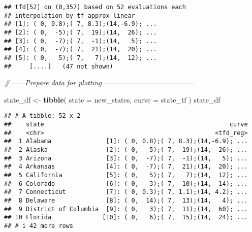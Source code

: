 \documentclass[
]{article}
\newenvironment{Shaded}{\begin{snugshade}}{\end{snugshade}}
\newcommand{\AttributeTok}[1]{\textcolor[rgb]{0.13,0.29,0.53}{#1}}
\newcommand{\CommentTok}[1]{\textcolor[rgb]{0.56,0.35,0.01}{\textit{#1}}}
\newcommand{\FunctionTok}[1]{\textcolor[rgb]{0.13,0.29,0.53}{\textbf{#1}}}
\newcommand{\NormalTok}[1]{#1}
\newcommand{\OtherTok}[1]{\textcolor[rgb]{0.56,0.35,0.01}{#1}}
\begin{document}
\begin{verbatim}
## tfd[52] on (0,357) based on 52 evaluations each
## interpolation by tf_approx_linear 
## [1]: ( 0, 0.8);( 7, 8.3);(14,-6.9); ...
## [2]: ( 0,  -5);( 7,  19);(14,  26); ...
## [3]: ( 0,  -7);( 7,  -1);(14,   5); ...
## [4]: ( 0,  -7);( 7,  21);(14,  20); ...
## [5]: ( 0,   5);( 7,   7);(14,  12); ...
##     [....]   (47 not shown)
\end{verbatim}

\begin{Shaded}
\begin{Highlighting}[]
\CommentTok{\# ── Prepare data for plotting ──────────────────}

\NormalTok{state\_df }\OtherTok{\textless{}{-}} \FunctionTok{tibble}\NormalTok{(}
  \AttributeTok{state =}\NormalTok{ new\_states,}
  \AttributeTok{curve =}\NormalTok{ state\_tf}
\NormalTok{)}
\NormalTok{state\_df}
\end{Highlighting}
\end{Shaded}

\begin{verbatim}
## # A tibble: 52 x 2
##    state                                                   curve
##    <chr>                                               <tfd_reg>
##  1 Alabama               [1]: ( 0, 0.8);( 7, 8.3);(14,-6.9); ...
##  2 Alaska                [2]: ( 0,  -5);( 7,  19);(14,  26); ...
##  3 Arizona               [3]: ( 0,  -7);( 7,  -1);(14,   5); ...
##  4 Arkansas              [4]: ( 0,  -7);( 7,  21);(14,  20); ...
##  5 California            [5]: ( 0,   5);( 7,   7);(14,  12); ...
##  6 Colorado              [6]: ( 0,   3);( 7,  10);(14,  14); ...
##  7 Connecticut           [7]: ( 0, 0.3);( 7, 1.1);(14, 4.2); ...
##  8 Delaware              [8]: ( 0,  14);( 7,  13);(14,   4); ...
##  9 District of Columbia  [9]: ( 0,   3);( 7,  11);(14,  60); ...
## 10 Florida              [10]: ( 0,   6);( 7,  15);(14,  24); ...
## # i 42 more rows
\end{verbatim}
\end{document}
